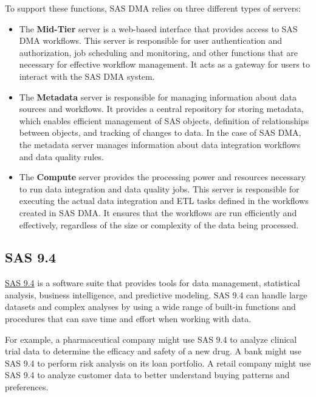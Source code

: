 To support these functions, SAS DMA relies on three different types of servers:

\begin{itemize}
    \item The \textbf{Mid-Tier} server is a web-based interface that provides access to SAS DMA workflows. This server is responsible for user authentication and authorization, job scheduling and monitoring, and other functions that are necessary for effective workflow management. It acts as a gateway for users to interact with the SAS DMA system.
    \item The \textbf{Metadata} server is responsible for managing information about data sources and workflows. It provides a central repository for storing metadata, which enables efficient management of SAS objects, definition of relationships between objects, and tracking of changes to data. In the case of SAS DMA, the metadata server manages information about data integration workflows and data quality rules.
    \item The \textbf{Compute} server provides the processing power and resources necessary to run data integration and data quality jobs. This server is responsible for executing the actual data integration and ETL tasks defined in the workflows created in SAS DMA. It ensures that the workflows are run efficiently and effectively, regardless of the size or complexity of the data being processed.
\end{itemize}

\subsection{SAS 9.4}
\href{https://documentation.sas.com/doc/en/pgmsascdc/9.4_3.5/whatsnew/n17cszme3e52b4n1ooe3710fnuec.htm#:~:text=For%20SAS%20administrators%2C%20SAS%209.4,more%20complete%20data%20management%20solution.}{SAS 9.4} is a software suite that provides tools for data management, statistical analysis, business intelligence, and predictive modeling. SAS 9.4 can handle large datasets and complex analyses by using a wide range of built-in functions and procedures that can save time and effort when working with data. 

For example, a pharmaceutical company might use SAS 9.4 to analyze clinical trial data to determine the efficacy and safety of a new drug. A bank might use SAS 9.4 to perform risk analysis on its loan portfolio. A retail company might use SAS 9.4 to analyze customer data to better understand buying patterns and preferences.

